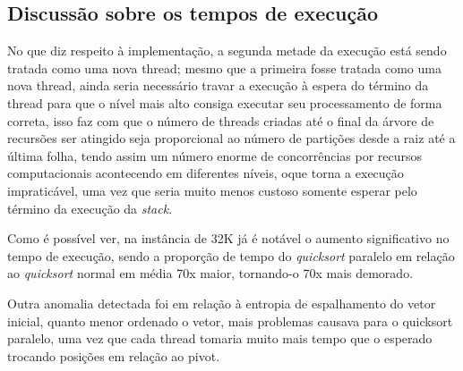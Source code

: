 \documentclass[a4paper, fontsize=12pt, parskip=half]{scrartcl}
\theoremstyle{mytheor}
\begin{document}
\subsection{Discussão sobre os tempos de execução}

No que diz respeito à implementação, a segunda metade da execução está sendo tratada como uma nova thread; mesmo que a primeira fosse tratada como uma nova thread, ainda seria necessário travar a execução à espera do término da thread para que o nível mais alto consiga executar seu processamento de forma correta, isso faz com que o número de threads criadas até o final da árvore de recursões ser atingido seja proporcional ao número de partições desde a raiz até a última folha, tendo assim um número enorme de concorrências por recursos computacionais acontecendo em diferentes níveis, oque torna a execução impraticável, uma vez que seria muito menos custoso somente esperar pelo término da execução da \textit{stack}. 

Como é possível ver, na instância de 32K já é notável o aumento significativo no tempo de execução, sendo a proporção de tempo do \textit{quicksort} paralelo em relação ao \textit{quicksort} normal em média 70x maior, tornando-o 70x mais demorado.

Outra anomalia detectada foi em relação à entropia de espalhamento do vetor inicial, quanto menor ordenado o vetor, mais problemas causava para o quicksort paralelo, uma vez que cada thread tomaria muito mais tempo que o esperado trocando posições em relação ao pivot.
\end{document}
